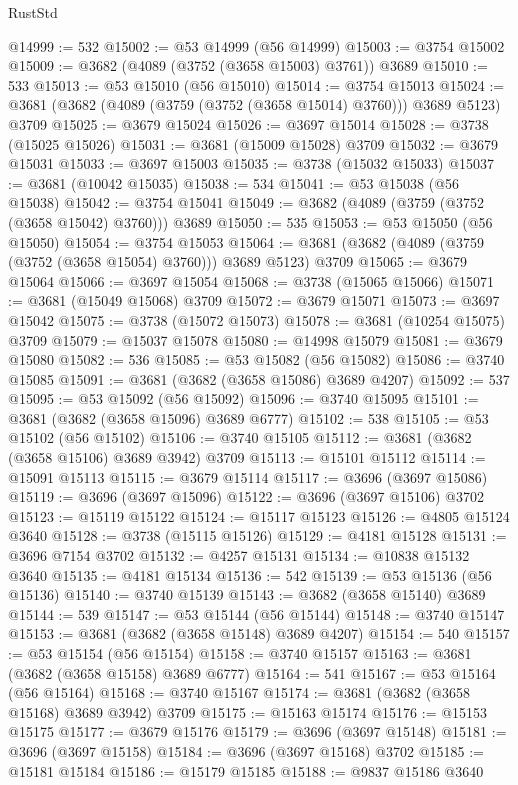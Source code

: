 \begin{lexlean}{RustStd}
\begin{coremodule}
@14999 := 532
@15002 := @53 @14999 (@56 @14999)
@15003 := @3754 @15002
@15009 := @3682 (@4089 (@3752 (@3658 @15003) @3761)) @3689
@15010 := 533
@15013 := @53 @15010 (@56 @15010)
@15014 := @3754 @15013
@15024 := @3681 (@3682 (@4089 (@3759 (@3752 (@3658 @15014) @3760))) @3689 @5123) @3709
@15025 := @3679 @15024
@15026 := @3697 @15014
@15028 := @3738 (@15025 @15026)
@15031 := @3681 (@15009 @15028) @3709
@15032 := @3679 @15031
@15033 := @3697 @15003
@15035 := @3738 (@15032 @15033)
@15037 := @3681 (@10042 @15035)
@15038 := 534
@15041 := @53 @15038 (@56 @15038)
@15042 := @3754 @15041
@15049 := @3682 (@4089 (@3759 (@3752 (@3658 @15042) @3760))) @3689
@15050 := 535
@15053 := @53 @15050 (@56 @15050)
@15054 := @3754 @15053
@15064 := @3681 (@3682 (@4089 (@3759 (@3752 (@3658 @15054) @3760))) @3689 @5123) @3709
@15065 := @3679 @15064
@15066 := @3697 @15054
@15068 := @3738 (@15065 @15066)
@15071 := @3681 (@15049 @15068) @3709
@15072 := @3679 @15071
@15073 := @3697 @15042
@15075 := @3738 (@15072 @15073)
@15078 := @3681 (@10254 @15075) @3709
@15079 := @15037 @15078
@15080 := @14998 @15079
@15081 := @3679 @15080
@15082 := 536
@15085 := @53 @15082 (@56 @15082)
@15086 := @3740 @15085
@15091 := @3681 (@3682 (@3658 @15086) @3689 @4207)
@15092 := 537
@15095 := @53 @15092 (@56 @15092)
@15096 := @3740 @15095
@15101 := @3681 (@3682 (@3658 @15096) @3689 @6777)
@15102 := 538
@15105 := @53 @15102 (@56 @15102)
@15106 := @3740 @15105
@15112 := @3681 (@3682 (@3658 @15106) @3689 @3942) @3709
@15113 := @15101 @15112
@15114 := @15091 @15113
@15115 := @3679 @15114
@15117 := @3696 (@3697 @15086)
@15119 := @3696 (@3697 @15096)
@15122 := @3696 (@3697 @15106) @3702
@15123 := @15119 @15122
@15124 := @15117 @15123
@15126 := @4805 @15124 @3640
@15128 := @3738 (@15115 @15126)
@15129 := @4181 @15128
@15131 := @3696 @7154 @3702
@15132 := @4257 @15131
@15134 := @10838 @15132 @3640
@15135 := @4181 @15134
@15136 := 542
@15139 := @53 @15136 (@56 @15136)
@15140 := @3740 @15139
@15143 := @3682 (@3658 @15140) @3689
@15144 := 539
@15147 := @53 @15144 (@56 @15144)
@15148 := @3740 @15147
@15153 := @3681 (@3682 (@3658 @15148) @3689 @4207)
@15154 := 540
@15157 := @53 @15154 (@56 @15154)
@15158 := @3740 @15157
@15163 := @3681 (@3682 (@3658 @15158) @3689 @6777)
@15164 := 541
@15167 := @53 @15164 (@56 @15164)
@15168 := @3740 @15167
@15174 := @3681 (@3682 (@3658 @15168) @3689 @3942) @3709
@15175 := @15163 @15174
@15176 := @15153 @15175
@15177 := @3679 @15176
@15179 := @3696 (@3697 @15148)
@15181 := @3696 (@3697 @15158)
@15184 := @3696 (@3697 @15168) @3702
@15185 := @15181 @15184
@15186 := @15179 @15185
@15188 := @9837 @15186 @3640

\end{coremodule}
\end{lexlean}
